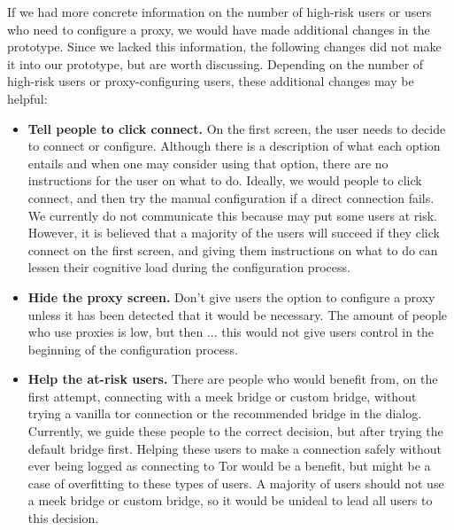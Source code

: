 \documentclass{template}
\begin{document}
If we had more concrete information on the number of high-risk users or users who need to configure a proxy, we would have made additional changes in the prototype. Since we lacked this information, the following changes did not make it into our prototype, but are worth discussing. Depending on the number of high-risk users or proxy-configuring users, these additional changes may be helpful: 
\begin{itemize} \itemsep1pt \parskip0pt  
\item {\bfseries Tell people to click connect.} On the first screen, the user needs to decide to connect or configure. Although there is a description of what each option entails and when one may consider using that option, there are no instructions for the user on what to do. Ideally, we would people to click connect, and then try the manual configuration if a direct connection fails. We currently do not communicate this because may put some users at risk. However, it is believed that a majority of the users will succeed if they click connect on the first screen, and giving them instructions on what to do can lessen their cognitive load during the configuration process. 
\item{\bfseries Hide the proxy screen.} Don't give users the option to configure a proxy unless it has been detected that it would be necessary. The amount of people who use proxies is low, but then ... this would not give users control in the beginning of the configuration process. 
\item{\bfseries Help the at-risk users.} There are people who would benefit from, on the first attempt, connecting with a meek bridge or custom bridge, without trying a vanilla tor connection or the recommended bridge in the dialog. Currently, we guide these people to the correct decision, but after trying the default bridge first. Helping these users to make a connection safely without ever being logged as connecting to Tor would be a benefit, but might be a case of overfitting to these types of users. A majority of users should not use a meek bridge or custom bridge, so it would be unideal to lead all users to this decision.
\end{itemize} 
\end{document}
